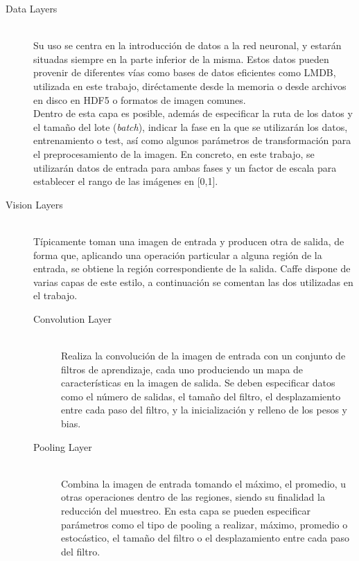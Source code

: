 \begin{description}
\item[Data Layers] \hfill 
\vspace{10pt}
\\
	Su uso se centra en la introducción de datos a la red neuronal, y estarán situadas siempre en la parte inferior de la misma. Estos datos pueden provenir de diferentes vías como bases de datos eficientes como LMDB, utilizada en este trabajo, diréctamente desde la memoria o desde archivos en disco en HDF5 o formatos de imagen comunes.\\
	Dentro de esta capa es posible, además de especificar la ruta de los datos y el tamaño del lote (\textit{batch}), indicar la fase en la que se utilizarán los datos, entrenamiento o test, así como algunos parámetros de transformación para el preprocesamiento de la imagen. En concreto, en este trabajo, se utilizarán datos de entrada para ambas fases y un factor de escala para establecer el rango de las imágenes en [0,1].
	\vspace{15pt}
	
\item[Vision Layers] \hfill 
\vspace{10pt}
\\
	Típicamente toman una imagen de entrada y producen otra de salida, de forma que, aplicando una operación particular a alguna región de la entrada, se obtiene la región correspondiente de la salida. Caffe dispone de varias capas de este estilo, a continuación se comentan las dos utilizadas en el trabajo.
	\vspace{10pt}
	\begin{description}
	\item[Convolution Layer] \hfill 
	\vspace{5pt}
	\\
		Realiza la convolución de la imagen de entrada con un conjunto de filtros de aprendizaje, cada uno produciendo un mapa de características en la imagen de salida. Se deben especificar datos como el número de salidas, el tamaño del filtro, el desplazamiento entre cada paso del filtro, y la inicialización y relleno de los pesos y bias.
		\vspace{10pt}
	\item[Pooling Layer] \hfill 
	\vspace{5pt}
	\\
		Combina la imagen de entrada tomando el máximo, el promedio, u otras operaciones dentro de las regiones, siendo su finalidad la reducción del muestreo. En esta capa se pueden especificar parámetros como el tipo de pooling a realizar, máximo, promedio o estocástico, el tamaño del filtro o el desplazamiento entre cada paso del filtro.
	\end{description}


\end{description}
